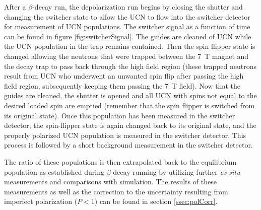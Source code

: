 After a $\beta$-decay run, the depolarization run begins by closing the shutter and changing the switcher
state to allow
the UCN to flow into the switcher detector for measurement of UCN populations. The switcher signal
as a function of time can be found in figure \ref{fig:switcherSignal}. The guides are cleaned of UCN while
the UCN population in the trap remains contained. Then the spin flipper state is changed allowing the
neutrons that were trapped between the 7~T magnet and the decay trap to pass back through the high
field region (these trapped neutrons result from UCN who underwent an unwanted spin flip after passing
the high field region, subsequently keeping them passing the 7~T field). Now that the guides are cleaned,
the shutter is opened and all UCN with spins not equal to the desired loaded spin are emptied (remember that
the spin flipper is switched from its original state). Once this population has been measured in the
switcher detector, the spin-flipper state is again changed back to its original state, and the
properly polarized UCN population is measured in the switcher detector. This process is followed by a short
background measurement in the switcher detector.

The ratio of these populations is then extrapolated back to the equilibrium population as established
during $\beta$-decay running by utilizing further \textit{ex situ} measurements and comparisons with
simulation. The results of these measurements as well as the correction to the uncertainty resulting
from imperfect polarization ($P<1$) can be found in section \ref{ssec:polCorr}.





